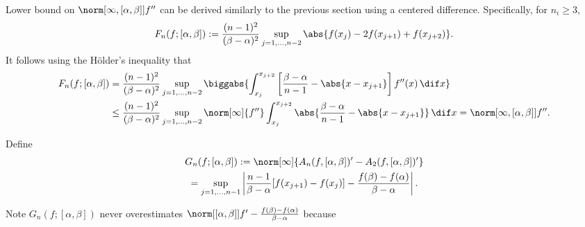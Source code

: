 \documentclass[]{elsarticle}
\theoremstyle{definition}
\theoremstyle{remark}
\begin{document}
Lower bound on $\norm[\infty,{[\alpha,\beta]}]{f''}$ can be derived similarly to the previous section using a centered difference.  Specifically, for $n_i \ge 3$,
\begin{equation} \label{Fnormappxalg}
F_{n}(f;[\alpha,\beta]) := \frac{(n-1)^2}{(\beta-\alpha)^2}\sup_{j=1, \ldots, n-2} \abs{f(x_j) - 2 f(x_{j+1})+f(x_{j+2})}.
\end{equation}
It follows using the H\"older's inequality that
\begin{align*}
F_{n}(f;[\alpha,\beta]) &= \frac{(n-1)^2}{(\beta-\alpha)^2}\sup_{j=1, \ldots, n-2}  \biggabs{\int_{x_j}^{x_{j+2}} \left[\frac{\beta-\alpha}{n-1} - \abs{x-x_{j+1}}\right] f''(x) \, \dif x} \\
&\le\frac{(n-1)^2}{(\beta-\alpha)^2}\sup_{j=1, \ldots, n-2}  \norm[\infty]{f''} \int_{x_j}^{x_{j+2}} \abs{\frac{\beta-\alpha}{n-1} - \abs{x-x_{j+1}}} \, \dif x = \norm[\infty,{[\alpha,\beta]}]{f''}.
\end{align*}


Define\begin{multline}\label{estfirstderiv}
G_n(f;[\alpha,\beta]) := \norm[\infty]{A_{n}(f,[\alpha,\beta])' - A_2(f,[\alpha,\beta])'} \\
= \sup_{j=1, \ldots, n-1} \left|\frac{n-1}{\beta-\alpha} [f(x_{j+1})-f(x_j)]-\frac{f(\beta)-f(\alpha)}{\beta-\alpha}\right|.
\end{multline}

Note $G_n(f;[\alpha,\beta])$ never overestimates $\norm[{[\alpha, \beta]}]{f'-\frac{f(\beta)-f(\alpha)}{\beta-\alpha}}$ because
\end{document}
